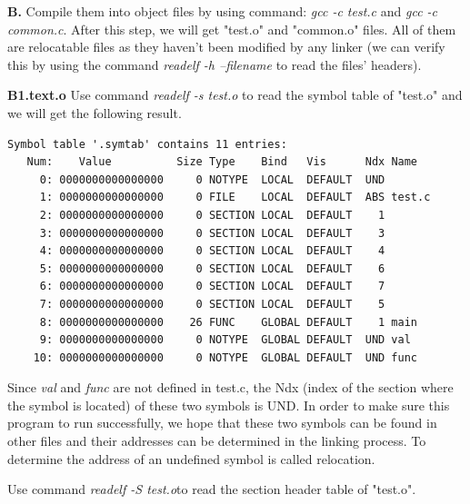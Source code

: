         \textbf{B.} Compile them into object files by using command: \textit{gcc -c test.c} and \textit{gcc -c common.c}. After this step, we will get "test.o" and "common.o" files. All of them are relocatable files as they haven't been modified by any linker (we can verify this by using the command \textit{readelf -h --filename} to read the files' headers).\newline
        
        
        
        \textbf{B1.text.o}
        Use command \textit{readelf -s test.o} to read the symbol table of "test.o" and we will get the following result. 
        
        \begin{lstlisting}[caption= Symbol table of "test.o"]
Symbol table '.symtab' contains 11 entries: 
   Num:    Value          Size Type    Bind   Vis      Ndx Name 
     0: 0000000000000000     0 NOTYPE  LOCAL  DEFAULT  UND 
     1: 0000000000000000     0 FILE    LOCAL  DEFAULT  ABS test.c 
     2: 0000000000000000     0 SECTION LOCAL  DEFAULT    1 
     3: 0000000000000000     0 SECTION LOCAL  DEFAULT    3 
     4: 0000000000000000     0 SECTION LOCAL  DEFAULT    4 
     5: 0000000000000000     0 SECTION LOCAL  DEFAULT    6 
     6: 0000000000000000     0 SECTION LOCAL  DEFAULT    7 
     7: 0000000000000000     0 SECTION LOCAL  DEFAULT    5 
     8: 0000000000000000    26 FUNC    GLOBAL DEFAULT    1 main 
     9: 0000000000000000     0 NOTYPE  GLOBAL DEFAULT  UND val 
    10: 0000000000000000     0 NOTYPE  GLOBAL DEFAULT  UND func
         \end{lstlisting}      
        
        Since \textit{val} and \textit{func} are not defined in test.c, the Ndx (index of the section where the symbol is located) of these two symbols is UND. In order to make sure this program to run successfully, we hope that these two symbols can be found in other files and their addresses can be determined in the linking process. To determine the address of an undefined symbol is called relocation.\newline
        
        Use command \textit{readelf -S test.o}to read the section header table of "test.o". 
        
